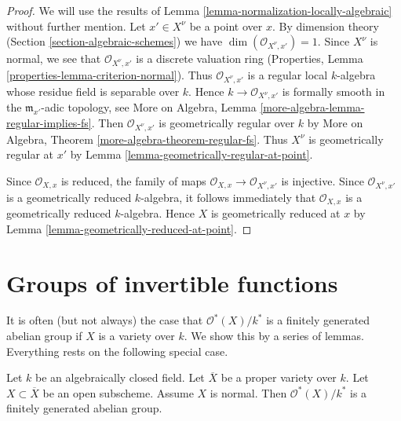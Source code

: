 \begin{proof}
We will use the results of Lemma \ref{lemma-normalization-locally-algebraic}
without further mention. Let $x' \in X^\nu$ be a point over $x$.
By dimension theory (Section \ref{section-algebraic-schemes}) we have
$\dim(\mathcal{O}_{X^\nu, x'}) = 1$. Since $X^\nu$ is normal, we
see that $\mathcal{O}_{X^\nu, x'}$ is a discrete valuation ring
(Properties, Lemma \ref{properties-lemma-criterion-normal}).
Thus $\mathcal{O}_{X^\nu, x'}$ is a regular local $k$-algebra
whose residue field is separable over $k$. Hence
$k \to \mathcal{O}_{X^\nu, x'}$ is formally smooth
in the $\mathfrak m_{x'}$-adic topology, see
More on Algebra, Lemma \ref{more-algebra-lemma-regular-implies-fs}.
Then $\mathcal{O}_{X^\nu, x'}$ is geometrically regular
over $k$ by
More on Algebra, Theorem \ref{more-algebra-theorem-regular-fs}.
Thus $X^\nu$ is geometrically regular at $x'$ by
Lemma \ref{lemma-geometrically-regular-at-point}.

\medskip\noindent
Since $\mathcal{O}_{X, x}$ is reduced, the family of maps
$\mathcal{O}_{X, x} \to \mathcal{O}_{X^\nu, x'}$ is injective.
Since $\mathcal{O}_{X^\nu, x'}$ is a geometrically reduced
$k$-algebra, it follows immediately that $\mathcal{O}_{X, x}$
is a geometrically reduced $k$-algebra. Hence $X$ is geometrically
reduced at $x$ by Lemma \ref{lemma-geometrically-reduced-at-point}.
\end{proof}









\section{Groups of invertible functions}
\label{section-units}

\noindent
It is often (but not always) the case that $\mathcal{O}^*(X)/k^*$
is a finitely generated abelian group if $X$ is a variety over $k$.
We show this by a series of lemmas.
Everything rests on the following special case.

\begin{lemma}
\label{lemma-open-in-normal-proper}
Let $k$ be an algebraically closed field.
Let $\overline{X}$ be a proper variety over $k$.
Let $X \subset \overline{X}$ be an open subscheme.
Assume $X$ is normal.
Then $\mathcal{O}^*(X)/k^*$ is a finitely generated abelian group.
\end{lemma}

